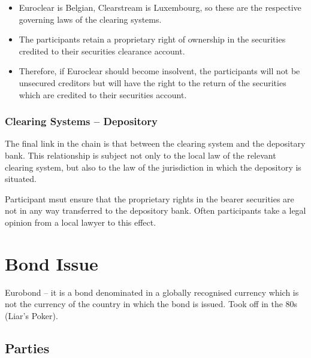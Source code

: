 \documentclass[
]{article}
\newenvironment{Shaded}{}{}
\newcommand{\NormalTok}[1]{#1}
\providecommand{\tightlist}{%
  \setlength{\itemsep}{0pt}\setlength{\parskip}{0pt}}
\begin{document}
\begin{itemize}
\tightlist
\item
  Euroclear is Belgian, Clearstream is Luxembourg, so these are the
  respective governing laws of the clearing systems.
\item
  The participants retain a proprietary right of ownership in the
  securities credited to their securities clearance account.
\item
  Therefore, if Euroclear should become insolvent, the participants will
  not be unsecured creditors but will have the right to the return of
  the securities which are credited to their securities account.
\end{itemize}

\hypertarget{clearing-systems-depository}{%
\subsubsection{Clearing Systems --
Depository}\label{clearing-systems-depository}}

The final link in the chain is that between the clearing system and the
depositary bank. This relationship is subject not only to the local law
of the relevant clearing system, but also to the law of the jurisdiction
in which the depository is situated.

\begin{Shaded}
\begin{Highlighting}[]
\NormalTok{Participant msut ensure that the proprietary rights in the bearer securities are not in any way transferred to the depository bank. Often participants take a legal opinion from a local lawyer to this effect. }
\end{Highlighting}
\end{Shaded}

\hypertarget{bond-issue}{%
\section{Bond Issue}\label{bond-issue}}

Eurobond -- it is a bond denominated in a globally recognised currency
which is not the currency of the country in which the bond is issued.
Took off in the 80s (Liar's Poker).

\hypertarget{parties}{%
\subsection{Parties}\label{parties}}
\end{document}
